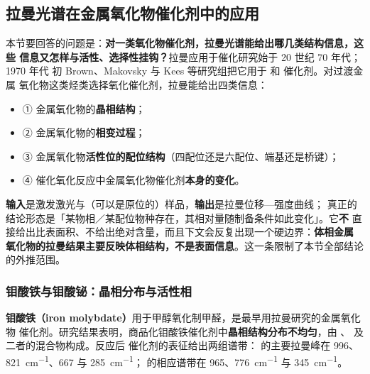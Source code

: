
\subsection{拉曼光谱在金属氧化物催化剂中的应用}

\begin{probout}
本节要回答的问题是：\textbf{对一类氧化物催化剂，拉曼光谱能给出哪几类结构信息，这些
信息又怎样与活性、选择性挂钩？}拉曼应用于催化研究始于 20 世纪 70 年代；1970 年代
初 Brown、Makovsky 与 Kees 等研究组把它用于  和
 催化剂。对过渡金属
氧化物这类烃类选择氧化催化剂，拉曼能给出四类信息：

\begin{itemize}
\item ① 金属氧化物的\textbf{晶相结构}；
\item ② 金属氧化物的\textbf{相变过程}；
\item ③ 金属氧化物\textbf{活性位的配位结构}（四配位还是六配位、端基还是桥键）；
\item ④ 催化氧化反应中金属氧化物催化剂\textbf{本身的变化}。
\end{itemize}

\textbf{输入}是激发激光与（可以是原位的）样品，\textbf{输出}是拉曼位移—强度曲线；
真正的结论形态是「某物相／某配位物种存在，其相对量随制备条件如此变化」。它\textbf{不}
直接给出比表面积、不给出绝对含量，而且下文会反复出现一个硬边界：\textbf{体相金属
氧化物的拉曼结果主要反映体相结构，不是表面信息}。这一条限制了本节全部结论的外推范围。
\end{probout}

\subsubsection{钼酸铁与钼酸铋：晶相分布与活性相}

\textbf{钼酸铁（iron molybdate）}用于甲醇氧化制甲醛，是最早用拉曼研究的金属氧化物
催化剂。研究结果表明，商品化钼酸铁催化剂中\textbf{晶相结构分布不均匀}，由 、
 及二者的混合物构成。反应后
催化剂的表征给出两组谱带： 的主要拉曼峰在 996、\qty{821}{cm^{-1}}、667 与
\qty{285}{cm^{-1}}； 的相应谱带在 965、\qty{776}{cm^{-1}} 与
\qty{345}{cm^{-1}}。

